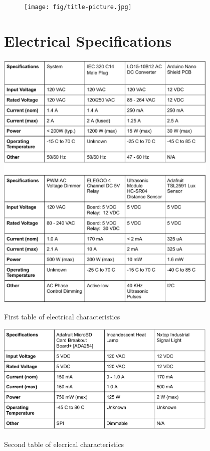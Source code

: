\documentclass{article}
\begin{document}
\vspace{2.54cm}

\begin{figure}[H]
    \centering
    \texttt{[image: fig/title-picture.jpg]}
\end{figure}

\section{Electrical Specifications}

\begin{table}[H]
    \centering
    \includegraphics[width=0.8\textwidth]{fig/electrical-chars-1.pdf}
    \caption{First table of electrical characteristics}
    \label{fig:electric-char-1}
\end{table}

\begin{table}[H]
    \centering
    \includegraphics[width=0.8\textwidth]{fig/electrical-chars-2.pdf}
    \caption{Second table of elecrical characteristics}
    \label{fig:electric-char-2}
\end{table}
\end{document}
